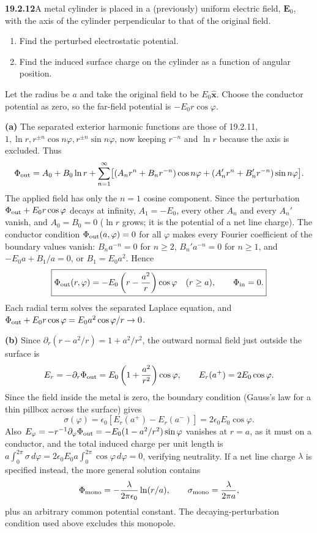 \par\bigskip
\noindent\textbf{19.2.12}\quad A metal cylinder is placed in a
(previously) uniform electric field, $\mathbf{E}_{0}$, with the
axis of the cylinder perpendicular to that of the original field.
\begin{enumerate}
\item[(a)] Find the perturbed electrostatic potential.
\item[(b)] Find the induced surface charge on the cylinder as a
function of angular position.
\end{enumerate}
\solution
{}
Let the radius be $a$ and take the original field to be $E_0\hat{\mathbf x}$.
Choose the conductor potential as zero, so the far-field potential is
$-E_0r\cos\varphi$.

\textbf{(a)} The separated exterior harmonic functions are those of
19.2.11, $1,\ln r,r^{\pm n}\cos n\varphi,r^{\pm n}\sin n\varphi$, now
keeping $r^{-n}$ and $\ln r$ because the axis is excluded. Thus
\[
\Phi_{\rm out}=A_0+B_0\ln r+\sum_{n=1}^{\infty}
\bigl[(A_nr^n+B_nr^{-n})\cos n\varphi
+(A_n'r^n+B_n'r^{-n})\sin n\varphi\bigr].
\]
The applied field has only the $n=1$ cosine component. Since the
perturbation $\Phi_{\rm out}+E_0r\cos\varphi$ decays at infinity,
$A_1=-E_0$, every other $A_n$ and every $A_n'$ vanish, and
$A_0=B_0=0$ ($\ln r$ grows; it is the potential of a net line charge).
The conductor condition $\Phi_{\rm out}(a,\varphi)=0$ for all $\varphi$
makes every Fourier coefficient of the boundary values vanish:
$B_na^{-n}=0$ for $n\ge2$, $B_n'a^{-n}=0$ for $n\ge1$, and
$-E_0a+B_1/a=0$, or $B_1=E_0a^2$. Hence
\[
\boxed{\Phi_{\rm out}(r,\varphi)
=-E_0\left(r-\frac{a^2}{r}\right)\cos\varphi\quad(r\ge a),
\qquad\Phi_{\rm in}=0.}
\]
Each radial term solves the separated Laplace equation, and
$\Phi_{\rm out}+E_0r\cos\varphi=E_0a^2\cos\varphi/r\to0$.

\textbf{(b)} Since $\partial_r(r-a^2/r)=1+a^2/r^2$, the outward normal
field just outside the surface is
\[
E_r=-\partial_r\Phi_{\rm out}
=E_0\left(1+\frac{a^2}{r^2}\right)\cos\varphi,
\qquad E_r(a^+)=2E_0\cos\varphi.
\]
Since the field inside the metal is zero, the boundary condition
(Gauss's law for a thin pillbox across the surface) gives
\[
\boxed{\sigma(\varphi)=\epsilon_0[E_r(a^+)-E_r(a^-)]
=2\epsilon_0E_0\cos\varphi.}
\]
Also
$E_\varphi=-r^{-1}\partial_\varphi\Phi_{\rm out}
=-E_0(1-a^2/r^2)\sin\varphi$ vanishes at $r=a$, as it must on a
conductor, and the total induced charge per unit length is
$a\int_0^{2\pi}\sigma\,d\varphi=2\epsilon_0E_0a\int_0^{2\pi}\cos\varphi
\,d\varphi=0$, verifying neutrality.
If a net line charge $\lambda$ is specified instead, the more general
solution contains
\[
\Phi_{\rm mono}=-\frac{\lambda}{2\pi\epsilon_0}\ln(r/a),
\qquad \sigma_{\rm mono}=\frac{\lambda}{2\pi a},
\]
plus an arbitrary common potential constant. The decaying-perturbation
condition used above excludes this monopole.

